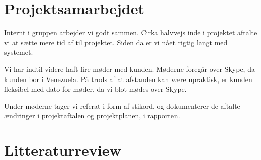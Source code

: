 \documentclass[12pt,a4paper]{article}
\begin{document}
\section{Projektsamarbejdet}
Internt i gruppen arbejder vi godt sammen. Cirka halvvejs inde i projektet aftalte vi at sætte mere tid af til projektet. Siden da er vi nået rigtig langt med systemet. 

Vi har indtil videre haft fire møder med kunden. Møderne foregår over Skype, da kunden bor i Venezuela. På trods af at afstanden kan være upraktisk, er kunden fleksibel med dato for møder, da vi blot mødes over Skype.

Under møderne tager vi referat i form af stikord, og dokumenterer de aftalte ændringer i projektaftalen og projektplanen, i rapporten. 
\section{Litteraturreview}
\end{document}
